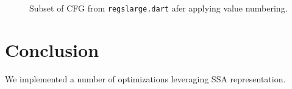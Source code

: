 \documentclass[10pt,twocolumn]{article}
\begin{document}
\begin{figure}
\begin{center}
\begin{minipage}{0.95\columnwidth}
  \caption{\label{fig:regslarge-gce} Subset of CFG from \texttt{regslarge.dart} afer applying value numbering.}
\end{minipage}
\end{center}
\end{figure}

\section{Conclusion}

We implemented a number of optimizations leveraging SSA representation.



\end{document}
